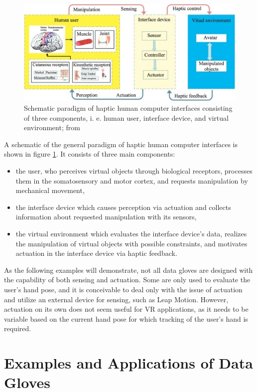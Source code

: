 \documentclass[hyperref, bachelorofscience]{cgvpub}
\begin{document}
\begin{figure}[t!]
	\centering
	\includegraphics[width=.8\linewidth]{../pics/wang01}
	\caption[Schematic paradigm of haptic human computer interfaces]{Schematic paradigm of haptic human computer interfaces consisting of three components, i. e. human user, interface device, and virtual environment; from \cite{wang19}}
	\label{fig:hci}
\end{figure}

A schematic of the general paradigm of haptic human computer interfaces is shown in figure \ref{fig:hci}. It consists of three main components:
\vspace{.3cm}
\begin{itemize}
	\item the user, who perceives virtual objects through biological receptors, processes them in the somatosensory and motor cortex, and requests manipulation by mechanical movement,
	\item the interface device which causes perception via actuation and collects information about requested manipulation with its sensors,
	\item the virtual environment which evaluates the interface device's data, realizes the manipulation of virtual objects with possible constraints, and motivates actuation in the interface device via haptic feedback.
\end{itemize}

As the following examples will demonstrate, not all data gloves are designed with the capability of both sensing and actuation. Some are only used to evaluate the user's hand pose, and it is conceivable to deal only with the issue of actuation and utilize an external device for sensing, such as Leap Motion. However, actuation on its own does not seem useful for VR applications, as it needs to be variable based on the current hand pose for which tracking of the user's hand is required.

\section{Examples and Applications of Data Gloves} \label{sec:ex}
\end{document}
